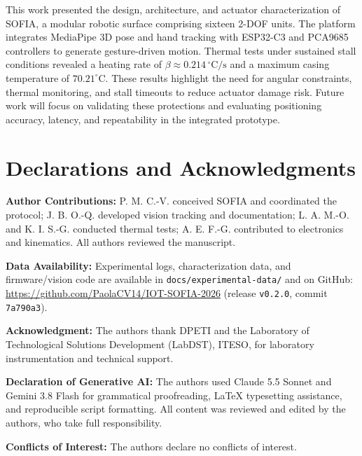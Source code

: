 \documentclass[lettersize,journal]{IEEEtran}
\begin{document}
	This work presented the design, architecture,
	and actuator characterization of SOFIA, a modular robotic surface
	comprising sixteen 2-DOF units. The platform integrates MediaPipe
	3D pose and hand tracking with ESP32-C3 and PCA9685 controllers
	to generate gesture-driven motion. Thermal tests under sustained
	stall conditions revealed a heating rate of
	$\beta \approx 0.214\,^\circ\text{C/s}$ and a maximum casing
	temperature of $70.21^\circ\text{C}$. These results highlight
	the need for angular constraints, thermal monitoring, and
	stall timeouts to reduce actuator damage risk. Future work will
	focus on validating these protections and evaluating positioning
	accuracy, latency, and repeatability in the integrated prototype.
	
	\section*{Declarations and Acknowledgments}
	\footnotesize
	
	\noindent\textbf{Author Contributions:}
	P. M. C.-V. conceived SOFIA and coordinated the protocol;
	J. B. O.-Q. developed vision tracking and documentation;
	L. A. M.-O. and K. I. S.-G. conducted thermal tests;
	A. E. F.-G. contributed to electronics and kinematics.
	All authors reviewed the manuscript.
	
	\noindent\textbf{Data Availability:} 
	Experimental logs, characterization data, and firmware/vision code
	are available in \texttt{docs/experimental-data/} and on GitHub:
	\url{https://github.com/PaolaCV14/IOT-SOFIA-2026}
	(release \texttt{v0.2.0}, commit \texttt{7a790a3}).
	
	\noindent\textbf{Acknowledgment:} 
	The authors thank DPETI and the Laboratory of Technological
	Solutions Development (LabDST), ITESO, for laboratory
	instrumentation and technical support.
	
	\noindent\textbf{Declaration of Generative AI:} 
	The authors used Claude 5.5 Sonnet and Gemini 3.8 Flash for
	grammatical proofreading, LaTeX typesetting assistance, and
	reproducible script formatting. All content was reviewed and
	edited by the authors, who take full responsibility.
	
	\noindent\textbf{Conflicts of Interest:}
	The authors declare no conflicts of interest.
	
	\normalsize
	
	\balance
	
	
	
\end{document}
